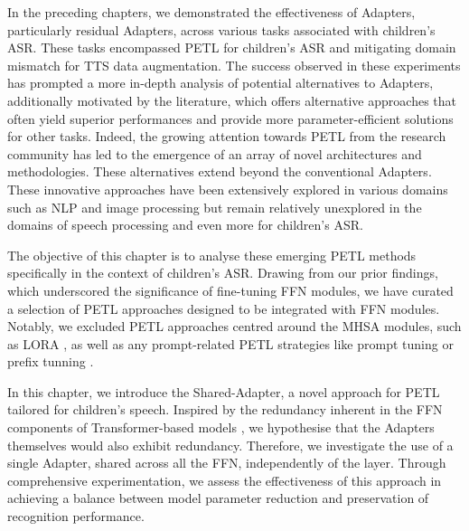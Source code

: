 \label{chap:7}
\cleardoublepage
In the preceding chapters, we demonstrated the effectiveness of Adapters, particularly residual Adapters, across various tasks associated with children's \ac{ASR}. These tasks encompassed \ac{PETL} for children's \ac{ASR} and mitigating domain mismatch for \ac{TTS} data augmentation. The success observed in these experiments has prompted a more in-depth analysis of potential alternatives to Adapters, additionally motivated by the literature, which offers alternative approaches that often yield superior performances and provide more parameter-efficient solutions for other tasks.
Indeed, the growing attention towards \ac{PETL} from the research community has led to the emergence of an array of novel architectures and methodologies. These alternatives extend beyond the conventional Adapters. These innovative approaches have been extensively explored in various domains such as \ac{NLP} and image processing but remain relatively unexplored in the domains of speech processing \cite{chen2023exploring} and even more for children's \ac{ASR}.

The objective of this chapter is to analyse these emerging \ac{PETL} methods specifically in the context of children's \ac{ASR}. Drawing from our prior findings, which underscored the significance of fine-tuning \ac{FFN} modules, we have curated a selection of \ac{PETL} approaches designed to be integrated with \ac{FFN} modules. Notably, we excluded \ac{PETL} approaches centred around the \ac{MHSA} modules, such as LORA \cite{hu2022lora}, as well as any prompt-related \ac{PETL} strategies like prompt tuning \cite{lester-etal-2021-power} or prefix tunning \cite{li-liang-2021-prefix}.

In this chapter, we introduce the Shared-Adapter, a novel approach for \ac{PETL} tailored for children's speech. Inspired by the redundancy inherent in the \ac{FFN} components of Transformer-based models \cite{pires2023one}, we hypothesise that the Adapters themselves would also exhibit redundancy. Therefore, we investigate the use of a single Adapter, shared across all the \ac{FFN}, independently of the layer. Through comprehensive experimentation, we assess the effectiveness of this approach in achieving a balance between model parameter reduction and preservation of recognition performance.


